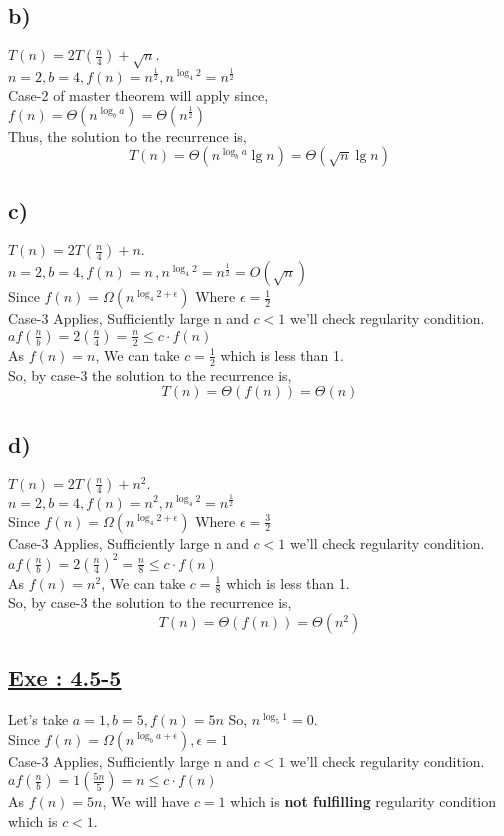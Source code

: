 \documentclass[a4paper, 11pt]{article}
\begin{document}
\subsection*{b)}
$T(n) = 2T(\frac{n}{4}) + \sqrt{n}.$\\
$ n=2, b=4, f(n)=n^{\frac{1}{2}},n^{\log_{4}2}=n^{\frac{1}{2}} $\\
Case-2 of master theorem will apply since,\\
$f(n)= \Theta(n^{\log_{b}a}) = \Theta (n^{\frac{1}{2}})$\\
Thus, the solution to the recurrence is,
$$T(n) = \Theta(n^{\log_{b}a}\lg n) = \Theta(\sqrt{n}\lg n)$$

\subsection*{c)}
$T(n) = 2T(\frac{n}{4}) + n .$\\
$ n=2, b=4, f(n)=n \, ,n^{\log_{4}2}=n^{\frac{1}{2}} = O(\sqrt{n}) $\\
Since $f(n) = \Omega(n^{\log_{4}2 + \epsilon})$ Where $\epsilon=\frac{1}{2}$\\
Case-3 Applies, Sufficiently large n and $c<1$ we'll check regularity condition.\\
$af(\frac{n}{b}) = 2(\frac{n}{4}) = \frac{n}{2} \le c \cdot f(n)$\\
As $f(n)=n$, We can take $c=\frac{1}{2}$ which is less than 1.\\
So, by case-3 the solution to the recurrence is,
$$T(n) = \Theta (f(n)) = \Theta(n)$$

\subsection*{d)}
$T(n) = 2T(\frac{n}{4}) + n^2 .$\\
$ n=2, b=4, f(n)=n^2,n^{\log_{4}2}=n^{\frac{1}{2}} $\\
Since $f(n) = \Omega(n^{\log_{4}2 + \epsilon})$ Where $\epsilon=\frac{3}{2}$\\
Case-3 Applies, Sufficiently large n and $c<1$ we'll check regularity condition.\\
$af(\frac{n}{b}) = 2(\frac{n}{4})^2 = \frac{n}{8} \le c \cdot f(n)$\\
As $f(n)=n^2$, We can take $c=\frac{1}{8}$ which is less than 1.\\
So, by case-3 the solution to the recurrence is,
$$T(n) = \Theta (f(n)) = \Theta(n^2)$$

\subsection*{\underline{Exe : 4.5-5}}
Let's take $a=1, b=5, f(n)= 5n$ So, $n^{\log_{5}1} = 0$.\\
Since $f(n) = \Omega(n^{\log_{b}a + \epsilon}) , \epsilon = 1$\\
Case-3 Applies, Sufficiently large n and $c<1$ we'll check regularity condition.\\
$af(\frac{n}{b}) = 1(\frac{5n}{5}) = n \le c \cdot f(n)$\\
As $f(n)= 5n$, We will have $c=1$ which is\textbf{ not fulfilling }regularity condition which is $c<1$.
\end{document}
